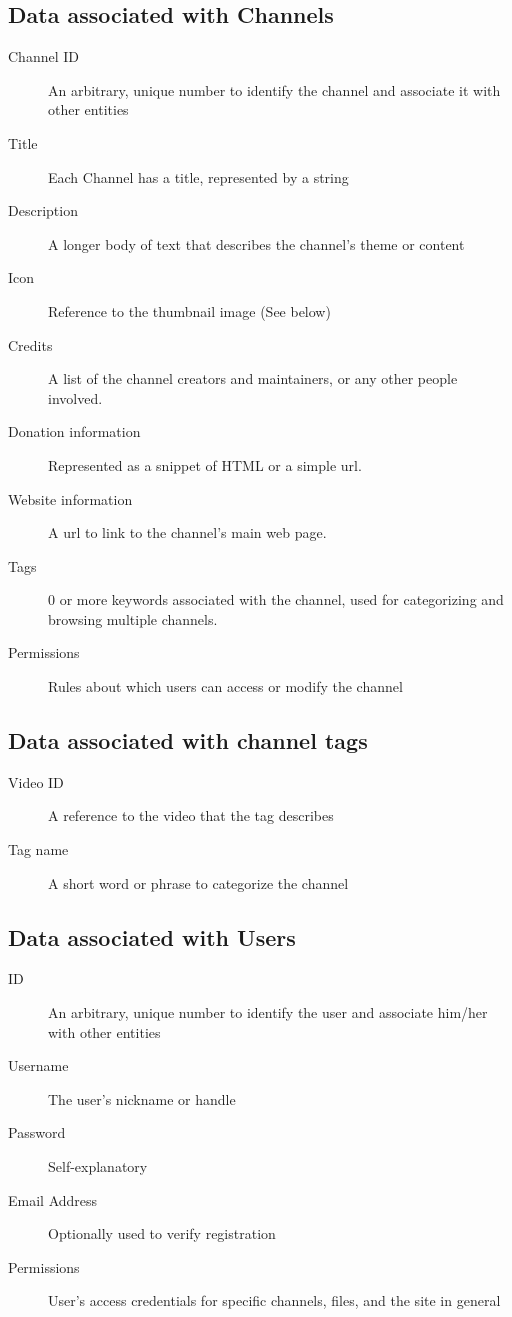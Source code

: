 \documentclass[a4paper,12pt]{report}
\begin{document}
\subsection{Data associated with Channels}
\begin{description}
\item[Channel ID] An arbitrary, unique number to identify the channel and  associate it with other entities
\item[Title] Each Channel has a title, represented by a string
\item[Description] A longer body of text that describes the channel's theme or content
\item[Icon] Reference to the thumbnail image (See below)
\item[Credits] A list of the channel creators and maintainers, or any other people involved.
\item[Donation information] Represented as a snippet of HTML or a simple url.
\item[Website information] A url to link to the channel's main web page.
\item[Tags] 0 or more keywords associated with the channel, used for categorizing and browsing multiple channels.
\item[Permissions] Rules about which users can access or modify the channel
\end{description}

\subsection{Data associated with channel tags}
\begin{description}
\item[Video ID] A reference to the video that the tag describes
\item[Tag name] A short word or phrase to categorize the channel
\end{description}

\subsection{Data associated with Users}
\begin{description}
\item[ID] An arbitrary, unique number to identify the user and associate him/her with other entities
\item[Username] The user's nickname or handle
\item[Password] Self-explanatory
\item[Email Address] Optionally used to verify registration
\item[Permissions] User's access credentials for specific channels, files, and the site in general
\end{description}
\end{document}
